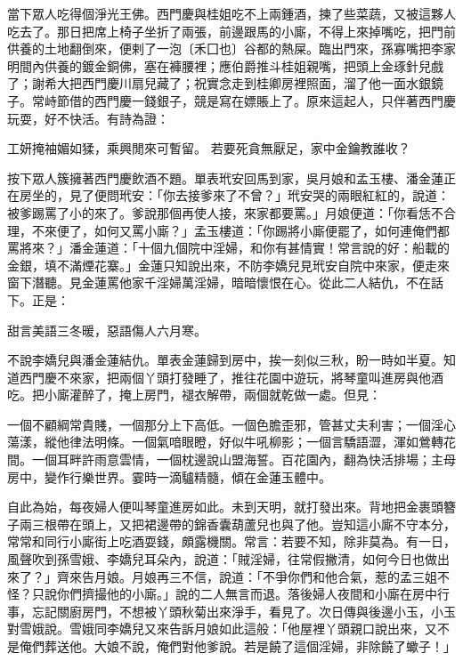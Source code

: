 當下眾人吃得個淨光王佛。西門慶與桂姐吃不上兩鍾酒，揀了些菜蔬，又被這夥人吃去了。那日把席上椅子坐折了兩張，前邊跟馬的小廝，不得上來掉嘴吃，把門前供養的土地翻倒來，便剌了一泡〔禾囗也〕谷都的熱屎。臨出門來，孫寡嘴把李家明間內供養的鍍金銅佛，塞在褲腰裡；應伯爵推斗桂姐親嘴，把頭上金琢針兒戲了；謝希大把西門慶川扇兒藏了；祝實念走到桂卿房裡照面，溜了他一面水銀鏡子。常峙節借的西門慶一錢銀子，競是寫在嫖賬上了。原來這起人，只伴著西門慶玩耍，好不快活。有詩為證：

工妍掩袖媚如猱，乘興閒來可暫留。
若要死貪無厭足，家中金鑰教誰收？

按下眾人簇擁著西門慶飲酒不題。單表玳安回馬到家，吳月娘和孟玉樓、潘金蓮正在房坐的，見了便問玳安：「你去接爹來了不曾？」玳安哭的兩眼紅紅的，說道：被爹踢罵了小的來了。爹說那個再使人接，來家都要罵。」月娘便道：「你看恁不合理，不來便了，如何又罵小廝？」孟玉樓道：「你踢將小廝便罷了，如何連俺們都罵將來？」潘金蓮道：「十個九個院中淫婦，和你有甚情實！常言說的好：船載的金銀，填不滿煙花寨。」金蓮只知說出來，不防李嬌兒見玳安自院中來家，便走來窗下潛聽。見金蓮罵他家千淫婦萬淫婦，暗暗懷恨在心。從此二人結仇，不在話下。正是：

甜言美語三冬暖，惡語傷人六月寒。

不說李嬌兒與潘金蓮結仇。單表金蓮歸到房中，挨一刻似三秋，盼一時如半夏。知道西門慶不來家，把兩個丫頭打發睡了，推往花園中遊玩，將琴童叫進房與他酒吃。把小廝灌醉了，掩上房門，褪衣解帶，兩個就乾做一處。但見：

一個不顧綱常貴賤，一個那分上下高低。一個色膽歪邪，管甚丈夫利害；一個淫心蕩漾，縱他律法明條。一個氣喑眼瞪，好似牛吼柳影；一個言驕語澀，渾如鶯轉花間。一個耳畔許雨意雲情，一個枕邊說山盟海誓。百花園內，翻為快活排場；主母房中，變作行樂世界。霎時一滴驢精髓，傾在金蓮玉體中。

自此為始，每夜婦人便叫琴童進房如此。未到天明，就打發出來。背地把金裹頭簪子兩三根帶在頭上，又把裙邊帶的錦香囊葫蘆兒也與了他。豈知這小廝不守本分，常常和同行小廝街上吃酒耍錢，頗露機關。常言：若要不知，除非莫為。有一日，風聲吹到孫雪娥、李嬌兒耳朵內，說道：「賊淫婦，往常假撇清，如何今日也做出來了？」齊來告月娘。月娘再三不信，說道：「不爭你們和他合氣，惹的孟三姐不怪？只說你們擠撮他的小廝。」說的二人無言而退。落後婦人夜間和小廝在房中行事，忘記關廚房門，不想被丫頭秋菊出來淨手，看見了。次日傳與後邊小玉，小玉對雪娥說。雪娥同李嬌兒又來告訴月娘如此這般：「他屋裡丫頭親口說出來，又不是俺們葬送他。大娘不說，俺們對他爹說。若是饒了這個淫婦，非除饒了蠍子！」

